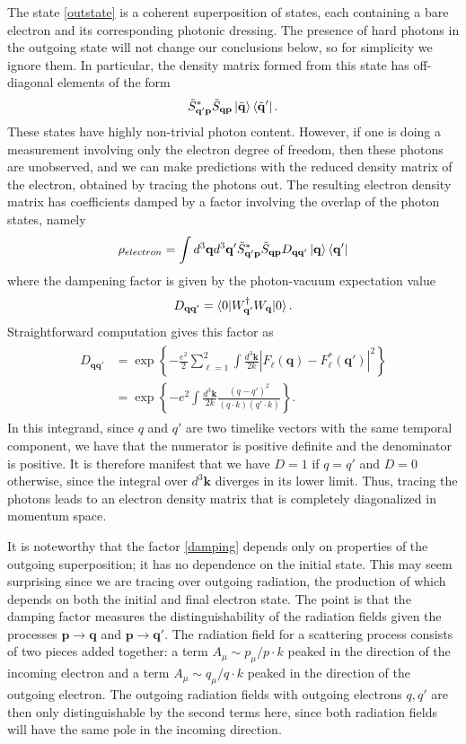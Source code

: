 \documentclass[twocolumn,prd]{revtex4}
\newcommand{\be}{\begin{equation}}
\newcommand{\ee}{\end{equation}}
\newcommand{\mb}{\mathbf}
\begin{document}
The state \eqref{outstate} is a coherent superposition of states, each containing a bare electron and its corresponding photonic dressing. The presence of hard photons in the outgoing state will not change our conclusions below, so for simplicity we ignore them. In particular, the density matrix formed from this state has off-diagonal elements of the form
\be
\tilde{S}^*_{\mb{q}' \mb{p}} \tilde{S}_{\mb{q} \mb{p}} \ket{\tilde{\mb{q}}} \bra{\tilde{\mb{q}}'} .
\ee
These states have highly non-trivial photon content. However, if one is doing a measurement involving only the electron degree of freedom, then these photons are unobserved, and we can make predictions with the reduced density matrix of the electron, obtained by tracing the photons out. The resulting electron density matrix has coefficients damped by a factor involving the overlap of the photon states, namely
\be
\label{electronDM}
\rho_{electron} = \int d^3\mb{q} d^3\mb{q}' \tilde{S}^*_{\mb{q}' \mb{p}} \tilde{S}_{\mb{q} \mb{p}} D_{\mb{q} \mb{q}'} \ket{\mb{q}} \bra{\mb{q}'}
\ee
where the dampening factor is given by the photon-vacuum expectation value
\be
D_{\mb{q} \mb{q}'} = \braket{ 0 | W_{\mb{q}'}^{\dagger} W_{\mb{q}} | 0 }.
\ee
Straightforward computation gives this factor as
\begin{align}
\begin{split}
\label{damping}
D_{\mb{q} \mb{q}'} & = \exp \left\{ -\frac{e^2}{2} \sum_{\ell=1}^{2} \int \frac{d^3\mb{k}}{2k} \left| F_{\ell}(\mb{q}) - F^*_{\ell}(\mb{q}') \right|^2 \right\} \\
& = \exp \left\{ -e^2 \int \frac{d^3\mb{k}}{2k} \frac{(q-q')^2}{(q \cdot k) (q' \cdot k)} \right\}.
\end{split}
\end{align}
In this integrand, since $q$ and $q'$ are two timelike vectors with the same temporal component, we have that the numerator is positive definite and the denominator is positive. It is therefore manifest that we have $D = 1$ if $q = q'$ and $D = 0$ otherwise, since the integral over $d^3\mb{k}$ diverges in its lower limit. Thus, tracing the photons leads to an electron density matrix that is completely diagonalized in momentum space. 

It is noteworthy that the factor \eqref{damping} depends only on properties of the outgoing superposition; it has no dependence on the initial state. This may seem surprising since we are tracing over outgoing radiation, the production of which depends on both the initial and final electron state. The point is that the damping factor measures the distinguishability of the radiation fields given the processes $\mb{p} \to \mb{q}$ and $\mb{p} \to \mb{q}'$. The radiation field for a scattering process consists of two pieces added together: a term $A_{\mu} \sim p_{\mu}/p \cdot k$ peaked in the direction of the incoming electron and a term $A_{\mu} \sim q_{\mu}/q \cdot k$ peaked in the direction of the outgoing electron. The outgoing radiation fields with outgoing electrons $q,q'$ are then only distinguishable by the second terms here, since both radiation fields will have the same pole in the incoming direction.
\end{document}
